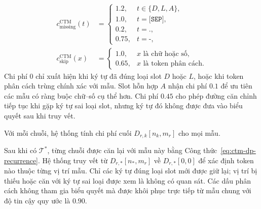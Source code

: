 \documentclass[../DoAn.tex]{subfiles}
\begin{document}
\begin{equation}
\begin{aligned}
c^{\mathrm{CTM}}_{\mathrm{missing}}(t)&=
\begin{cases}
1.2, & t\in\{D,L,A\},\\
1.0, & t=\texttt{[SEP]},\\
0.2, & t=\texttt{.},\\
0.75, & t=\texttt{-},
\end{cases}\\[0.5em]
c^{\mathrm{CTM}}_{\mathrm{skip}}(x)&=
\begin{cases}
1.0, & x\text{ là chữ hoặc số},\\
0.65, & x\text{ là token phân cách}.
\end{cases}
\end{aligned}
\label{eq:ctm-missing-skip-cost}
\end{equation}
Chi phí $0$ chỉ xuất hiện khi ký tự đã đúng loại slot $D$ hoặc $L$, hoặc khi
token phân cách trùng chính xác với mẫu. Slot hỗn hợp $A$ nhận chi phí $0.1$
để ưu tiên các mẫu có ràng buộc chữ--số cụ thể hơn. Chi phí $0.45$ cho phép
đường căn chỉnh tiếp tục khi gặp ký tự sai loại slot, nhưng ký tự đó không được
đưa vào biểu quyết sau khi truy vết.

Với mỗi chuỗi, hệ thống tính chi phí cuối $D_{r,k}[n_k,m_r]$ cho mọi mẫu.

Sau khi có $\mathcal{T}^{*}$, từng chuỗi được căn lại với mẫu này bằng
Công thức~\eqref{eq:ctm-dp-recurrence}. Hệ thống truy vết từ
$D_{r,*}[n_*,m_r]$ về $D_{r,*}[0,0]$ để xác định token nào thuộc từng vị trí
mẫu. Chỉ các ký tự đúng loại slot mới được giữ lại; vị trí bị thiếu hoặc căn
với ký tự sai loại được xem là không có quan sát. Các dấu phân cách không tham
gia biểu quyết mà được khôi phục trực tiếp từ mẫu chung với độ tin cậy quy ước
là $0.90$.
\end{document}
